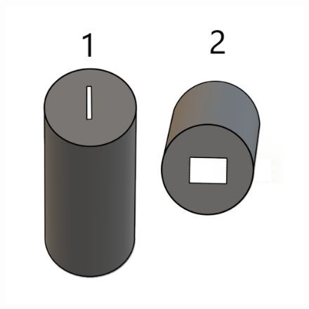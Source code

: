 \documentclass[10pt,a4paper]{article}
\begin{document}
\begin{figure}[H]
\centering
\includegraphics[scale=0.15]{Imagenes/actividad_cierre_01}
\end{figure}
\end{document}

